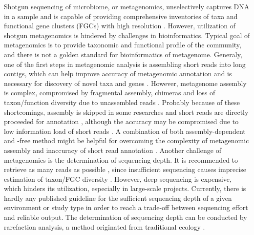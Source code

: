 \documentclass[11pt]{article}
\begin{document}
  Shotgun sequencing of microbiome, or metagenomics, unselectively captures DNA in a sample and is capable of providing comprehensive inventories of taxa and functional gene clusters (FGCs) with high resolution \citep{quince2017shotgun,new2020metagenomics}.
  \newline
  However, utilization of shotgun metagenomics is hindered by challenges in bioinformatics. 
  Typical goal of metagenomics is to provide taxonomic and functional profile of the community, and there is not a golden standard for bioinformatics of metagenome. 
  Generaly, one of the first steps in metagenomic analysis is assembling short reads into long contigs, which can help improve accuracy of metagenomic annotation \citep{tran2020assembling} and is necessary for 
  discovery of novel taxa and genes \citep{culligan2014metagenomics,youngblut2020large}. 
  However, metagenome assembly is complex, compromised by fragmental assembly, chimeras \citep{mikheenko2016metaquast} and loss of taxon/function diversity due to unassembled reads \citep{vollmers2017comparing,ayling2020new}. 
  Probably because of these shortcomings, assembly is skipped in some researches and short reads are directly proceeded for annotation \citep{tringe2005comparative,huson2007megan,abubucker2012metabolic,vermote2018amplicon,bovo2018shotgun}, although the accuracy may be compromised due to low information load of short reads \citep{wommack2008metagenomics,carr2014comparative,tran2020assembling}. 
  A combination of both assembly-dependent and -free method might be helpful for overcoming the complexity of metagenomic assembly and inaccuracy of short read annotation \citep{becker2020modular}. 
  \newline
  Another challenge of metagenomics is the determination of sequencing depth. 
  It is recommended to retrieve as many reads as possible \citep{quince2017shotgun}, since insufficient sequencing causes imprecise estimation of taxon/FGC diversity \citep{cattonaro2018you,zaheer2018impact,pereira2019impact,gweon2019impact}. 
  However, deep sequencing is expensive, which hinders its utilization, especially in large-scale projects. 
  Currently, there is hardly any published guideline for the sufficient sequencing depth of a given environment or study type in order to reach a trade-off between sequencing effort and reliable output. 
  \newline
  The determination of sequencing depth can be conducted by rarefaction analysis, a method originated from traditional ecology \citep{sanders1968marine,hurlbert1971nonconcept,heck1975explicit,moreno2000assessing,hortal2005ed,gomez2014using,hughes2021sampling}. 
\end{document}

